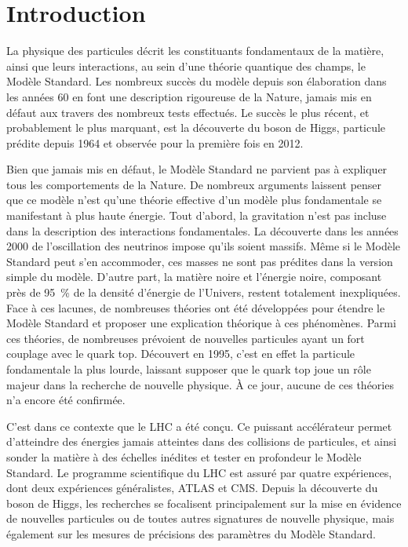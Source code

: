 \chapter*{Introduction}


La physique des particules décrit les constituants fondamentaux de la matière, ainsi que leurs interactions, au sein d'une théorie quantique des champs, le Modèle Standard. Les nombreux succès du modèle depuis son élaboration dans les années 60 en font une description rigoureuse de la Nature, jamais mis en défaut aux travers des nombreux tests effectués. Le succès le plus récent, et probablement le plus marquant, est la découverte du boson de Higgs, particule prédite depuis 1964 et observée pour la première fois en 2012.

Bien que jamais mis en défaut, le Modèle Standard ne parvient pas à expliquer tous les comportements de la Nature. De nombreux arguments laissent penser que ce modèle n'est qu'une théorie effective d'un modèle plus fondamentale se manifestant à plus haute énergie. Tout d'abord, la gravitation n'est pas incluse dans la description des interactions fondamentales. La découverte dans les années 2000 de l'oscillation des neutrinos impose qu'ils soient massifs. Même si le Modèle Standard peut s'en accommoder, ces masses ne sont pas prédites dans la version simple du modèle. D'autre part, la matière noire et l'énergie noire, composant près de \SI{95}{\percent} de la densité d'énergie de l'Univers, restent totalement inexpliquées. Face à ces lacunes, de nombreuses théories ont été développées pour étendre le Modèle Standard et proposer une explication théorique à ces phénomènes. Parmi ces théories, de nombreuses prévoient de nouvelles particules ayant un fort couplage avec le quark top. Découvert en 1995, c'est en effet la particule fondamentale la plus lourde, laissant supposer que le quark top joue un rôle majeur dans la recherche de nouvelle physique. À ce jour, aucune de ces théories n'a encore été confirmée.

\smallskip

C'est dans ce contexte que le LHC a été conçu. Ce puissant accélérateur permet d'atteindre des énergies jamais atteintes dans des collisions de particules, et ainsi sonder la matière à des échelles inédites et tester en profondeur le Modèle Standard. Le programme scientifique du LHC est assuré par quatre expériences, dont deux expériences généralistes, ATLAS et CMS. Depuis la découverte du boson de Higgs, les recherches se focalisent principalement sur la mise en évidence de nouvelles particules ou de toutes autres signatures de nouvelle physique, mais également sur les mesures de précisions des paramètres du Modèle Standard.

